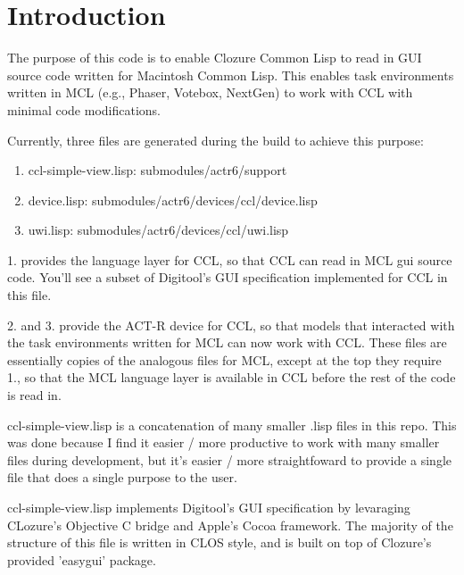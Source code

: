 \documentclass[12pt]{article} %
\begin{document}
\tableofcontents %

\newpage %


\section{Introduction} %

The purpose of this code is to enable Clozure Common Lisp to read in GUI source code written for Macintosh Common Lisp. This enables task environments written in MCL (e.g., Phaser, Votebox, NextGen) to work with CCL with minimal code modifications. 

Currently, three files are generated during the build to achieve this purpose:
\begin{enumerate}
\item ccl-simple-view.lisp: submodules/actr6/support
\item device.lisp: submodules/actr6/devices/ccl/device.lisp
\item uwi.lisp: submodules/actr6/devices/ccl/uwi.lisp
\end{enumerate}

1. provides the language layer for CCL, so that CCL can read in MCL gui source code. You'll see a subset of Digitool's GUI specification implemented for CCL in this file.

2. and 3. provide the ACT-R device for CCL, so that models that interacted with the task environments written for MCL can now work with CCL. These files are essentially copies of the analogous files for MCL, except at the top they require 1., so that the MCL language layer is available in CCL before the rest of the code is read in.

ccl-simple-view.lisp is a concatenation of many smaller .lisp files in this repo. This was done because I find it easier / more productive to work with many smaller files during development, but it's easier / more straightfoward to provide a single file that does a single purpose to the user. 

ccl-simple-view.lisp implements Digitool's GUI specification by levaraging CLozure's Objective C bridge and Apple's Cocoa framework. The majority of the structure of this file is written in CLOS style, and is built on top of Clozure's provided 'easygui' package. 
\end{document}
